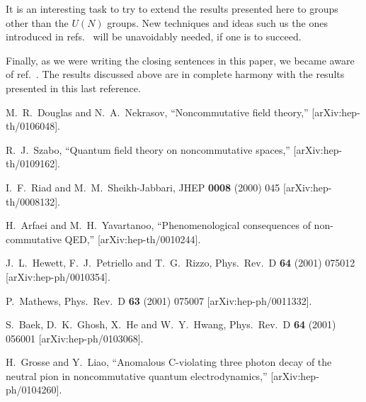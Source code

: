 \documentclass[a4paper,12pt]{article}
\begin{document}
It is an interesting task to try to extend the results presented here to 
groups  other than the $U(N)$ groups. New techniques and ideas such us the 
ones introduced in refs.~\cite{Bonora:2000td, Jurco:2001rq} will be 
unavoidably needed, if one is to succeed. 

Finally, as we were writing the closing sentences in this paper, we 
became aware of ref.~\cite{Bonora:2001fa}. The results discussed above are
in complete harmony with the results presented in this last reference.

\begin{thebibliography}{99}


M.~R.~Douglas and N.~A.~Nekrasov,
``Noncommutative field theory,''
[arXiv:hep-th/0106048].

R.~J.~Szabo,
``Quantum field theory on noncommutative spaces,''
[arXiv:hep-th/0109162].


I.~F.~Riad and M.~M.~Sheikh-Jabbari,
JHEP {\bf 0008} (2000) 045
[arXiv:hep-th/0008132].


H.~Arfaei and M.~H.~Yavartanoo,
``Phenomenological consequences of non-commutative QED,''
[arXiv:hep-th/0010244].

J.~L.~Hewett, F.~J.~Petriello and T.~G.~Rizzo,
Phys.\ Rev.\ D {\bf 64} (2001) 075012
[arXiv:hep-ph/0010354].

P.~Mathews,
Phys.\ Rev.\ D {\bf 63} (2001) 075007
[arXiv:hep-ph/0011332].



S.~Baek, D.~K.~Ghosh, X.~He and W.~Y.~Hwang,
Phys.\ Rev.\ D {\bf 64} (2001) 056001
[arXiv:hep-ph/0103068].

H.~Grosse and Y.~Liao,
``Anomalous C-violating three photon decay of the neutral pion in  noncommutative quantum electrodynamics,''
[arXiv:hep-ph/0104260].



\end{thebibliography}
\end{document}
